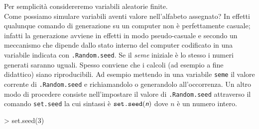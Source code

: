 \documentclass[onecolumn,12pt]{book}
\newcommand{\varia}[1]{\textsl{\textsf{#1}}}
\begin{document}
Per semplicit\`a considereremo variabili aleatorie finite.\\
Come possiamo simulare variabili aventi valore nell'alfabeto assegnato?
In effetti qualunque comando di generazione su un computer non \`e perfettamente casuale; infatti la generazione avviene in effetti in modo pseudo-casuale e  secondo un meccanismo che dipende dallo stato interno del computer codificato in una variabile indicata con \texttt{.Random.seed}. Se il {\it seme} iniziale \`e lo stesso i numeri generati saranno uguali. Spesso conviene che i calcoli (ad esempio a fine didattico) siano riproducibili. Ad esempio mettendo in una variabile \texttt{seme} il valore corrente di \texttt{.Random.seed} e richiamandolo o generandolo all'occorrenza.  
Un altro modo di procedere consiste nell'impostare il valore di 
\texttt{.Random.seed} attraverso il comando 
\texttt{set.seed}  la cui sintassi \`e 
$\texttt{set.seed}(\varia{n})$ dove $n$ \`e un numero intero.
 
\begin{Schunk}
\begin{Sinput}
> set.seed(3)
\end{Sinput}
\end{Schunk}
 
\end{document}
